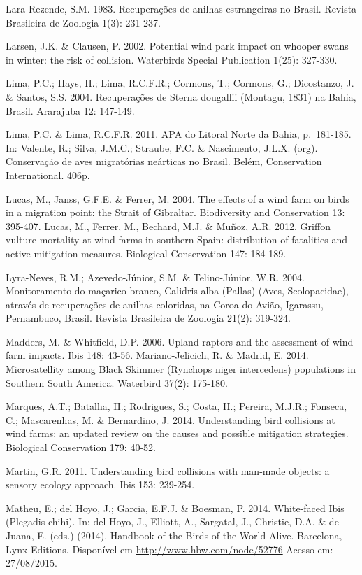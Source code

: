 \documentclass[
  oneside]{scrbook}
\begin{document}
Lara-Rezende, S.M. 1983. Recuperações de anilhas estrangeiras no Brasil. Revista Brasileira de Zoologia 1(3): 231-237.

Larsen, J.K. \& Clausen, P. 2002. Potential wind park impact on whooper swans in winter: the risk of collision. Waterbirds Special Publication 1(25): 327-330.

Lima, P.C.; Hays, H.; Lima, R.C.F.R.; Cormons, T.; Cormons, G.; Dicostanzo, J. \& Santos, S.S. 2004. Recuperações de Sterna dougallii (Montagu, 1831) na Bahia, Brasil. Ararajuba 12: 147-149.

Lima, P.C. \& Lima, R.C.F.R. 2011. APA do Litoral Norte da Bahia, p.~181-185. In: Valente, R.; Silva, J.M.C.; Straube, F.C. \& Nascimento, J.L.X. (org). Conservação de aves migratórias neárticas no Brasil. Belém, Conservation International. 406p.

Lucas, M., Janss, G.F.E. \& Ferrer, M. 2004. The effects of a wind farm on birds in a migration point: the Strait of Gibraltar. Biodiversity and Conservation 13: 395-407.
Lucas, M., Ferrer, M., Bechard, M.J. \& Muñoz, A.R. 2012. Griffon vulture mortality at wind farms in southern Spain: distribution of fatalities and active mitigation measures. Biological Conservation 147: 184-189.

Lyra-Neves, R.M.; Azevedo-Júnior, S.M. \& Telino-Júnior, W.R. 2004. Monitoramento do maçarico-branco, Calidris alba (Pallas) (Aves, Scolopacidae), através de recuperações de anilhas coloridas, na Coroa do Avião, Igarassu, Pernambuco, Brasil. Revista Brasileira de Zoologia 21(2): 319-324.

Madders, M. \& Whitfield, D.P. 2006. Upland raptors and the assessment of wind farm impacts. Ibis 148: 43-56.
Mariano-Jelicich, R. \& Madrid, E. 2014. Microsatellity among Black Skimmer (Rynchops niger intercedens) populations in Southern South America. Waterbird 37(2): 175-180.

Marques, A.T.; Batalha, H.; Rodrigues, S.; Costa, H.; Pereira, M.J.R.; Fonseca, C.; Mascarenhas, M. \& Bernardino, J. 2014. Understanding bird collisions at wind farms: an updated review on the causes and possible mitigation strategies. Biological Conservation 179: 40-52.

Martin, G.R. 2011. Understanding bird collisions with man-made objects: a sensory ecology approach. Ibis 153: 239-254.

Matheu, E.; del Hoyo, J.; Garcia, E.F.J. \& Boesman, P. 2014. White-faced Ibis (Plegadis chihi). In: del Hoyo, J., Elliott, A., Sargatal, J., Christie, D.A. \& de Juana, E. (eds.) (2014). Handbook of the Birds of the World Alive. Barcelona, Lynx Editions. Disponível em \url{http://www.hbw.com/node/52776} Acesso em: 27/08/2015.
\end{document}
